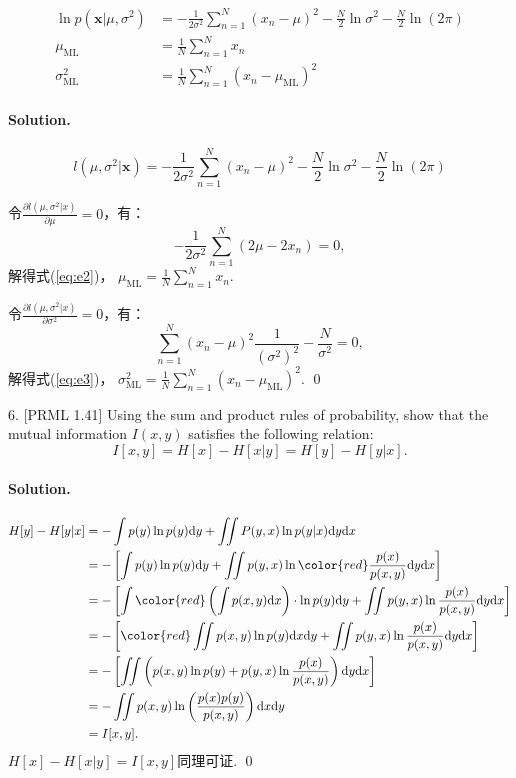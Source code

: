 \documentclass[a4paper, utf8]{ctexart}
\newenvironment{solution}
{\color{blue} \paragraph{Solution.}}
{\newline \qed}
\begin{document}
\begin{align}
\ln p(\textbf{x} |\mu, \sigma^2) &= - \frac{1}{2\sigma^2} \sum^N_{n=1}(x_n-\mu)^2 - \frac{N}{2}\ln \sigma^2 - \frac{N}{2}\ln(2\pi)  \label{eq:e1}\\
\mu_{\text{ML}} &= \frac{1}{N}\sum^N_{n=1}x_n \label{eq:e2} \\
\sigma^2_{\text{ML}} &= \frac{1}{N}\sum^N_{n=1}(x_n-\mu_{\text{ML}})^2	\label{eq:e3}
\end{align}

\begin{solution}
    \begin{equation*}
        l(\mu, \sigma^2 | \textbf{x}) = - \frac{1}{2\sigma^2} \sum^N_{n=1}(x_n-\mu)^2 - \frac{N}{2}\ln \sigma^2 - \frac{N}{2}\ln(2\pi)
    \end{equation*}

    令$\frac{\partial l(\mu, \sigma^2 | x)}{\partial \mu} = 0$，有：
    $$-\frac{1}{2\sigma^2}\sum^N_{n=1}(2\mu-2x_n) = 0,$$
    解得式(\ref{eq:e2})， $\mu_{\text{ML}} = \frac{1}{N}\sum^N_{n=1}x_n$.
        
    令$\frac{\partial l(\mu, \sigma^2 | x)}{\partial \sigma^2} = 0$，有：
    $$\sum^N_{n=1}(x_n - \mu)^2 \frac{1}{(\sigma^2)^2} - \frac{N}{\sigma^2} = 0,$$
    解得式(\ref{eq:e3})， $\sigma^2_{\text{ML}} = \frac{1}{N}\sum^N_{n=1}(x_n-\mu_{\text{ML}})^2$.
\end{solution}


6. {\color{red} [PRML 1.41]} Using the sum and product rules of probability, show that the mutual
information $I(x,y)$ satisfies the following relation:
 $$I[x,y] = H[x] - H[x|y] = H[y] - H[y|x].$$

\begin{solution}
    \begin{align*} 
H[y] - H[y|x] &= -\int p(y)\ln p(y)\text{d}y +\iint P(y,x)\ln p(y|x)\text{d}y\text{d}x \\
&= -\left[ \int p(y)\ln p(y)\text{d}y + \iint p(y,x)\ln{\color{red} \frac{p(x)}{p(x,y)}}\text{d}y\text{d}x \right ]\\
&= -\left[ \int {\color{red}\left( \int p(x,y)\text{d}x  \right )} \cdot \ln p(y)\text{d}y + \iint p(y,x)\ln \frac{p(x)}{p(x,y)}\text{d}y\text{d}x \right ]\\
&= -\left[ {\color{red}\iint  p(x,y) \ln p(y)\text{d}x  \text{d}y} + \iint p(y,x)\ln \frac{p(x)}{p(x,y)}\text{d}y\text{d}x \right ]\\
&= -\left[ \iint \left(  p(x,y) \ln p(y)+  p(y,x)\ln \frac{p(x)}{p(x,y)}\right ) \text{d}y\text{d}x \right ]\\
&=-\iint p(x, y) \ln \left(  \frac{p(x)p(y)}{p(x, y)} \right) \text{d}x \text{d}y\\
&= I[x, y].
\end{align*}
$H[x] - H[x|y] = I[x,y]$同理可证.
\end{solution}
\end{document}
